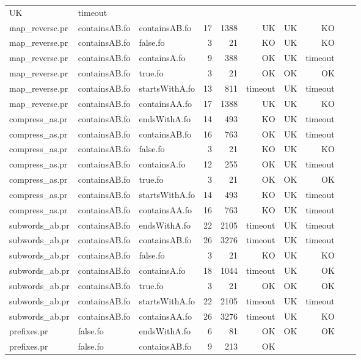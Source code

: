 \begin{tabular}{l|l|l|r|r|r|r|r|r|r}
UK & timeout \\
map\_reverse.pr & containsAB.fo & containsAB.fo & 17 & 1388 & UK & 
UK & KO \\
map\_reverse.pr & containsAB.fo & false.fo & 3 & 21 & KO & 
UK & KO \\
map\_reverse.pr & containsAB.fo & containsA.fo & 9 & 388 & OK & 
UK & timeout \\
map\_reverse.pr & containsAB.fo & true.fo & 3 & 21 & OK & 
OK & OK \\
map\_reverse.pr & containsAB.fo & startsWithA.fo & 13 & 811 & timeout & 
UK & timeout \\
map\_reverse.pr & containsAB.fo & containsAA.fo & 17 & 1388 & UK & 
UK & KO \\
compress\_as.pr & containsAB.fo & endsWithA.fo & 14 & 493 & KO & 
UK & timeout \\
compress\_as.pr & containsAB.fo & containsAB.fo & 16 & 763 & OK & 
UK & timeout \\
compress\_as.pr & containsAB.fo & false.fo & 3 & 21 & KO & 
UK & KO \\
compress\_as.pr & containsAB.fo & containsA.fo & 12 & 255 & OK & 
UK & timeout \\
compress\_as.pr & containsAB.fo & true.fo & 3 & 21 & OK & 
OK & OK \\
compress\_as.pr & containsAB.fo & startsWithA.fo & 14 & 493 & KO & 
UK & timeout \\
compress\_as.pr & containsAB.fo & containsAA.fo & 16 & 763 & KO & 
UK & timeout \\
subwords\_ab.pr & containsAB.fo & endsWithA.fo & 22 & 2105 & timeout & 
UK & timeout \\
subwords\_ab.pr & containsAB.fo & containsAB.fo & 26 & 3276 & timeout & 
UK & timeout \\
subwords\_ab.pr & containsAB.fo & false.fo & 3 & 21 & KO & 
UK & KO \\
subwords\_ab.pr & containsAB.fo & containsA.fo & 18 & 1044 & timeout & 
UK & OK \\
subwords\_ab.pr & containsAB.fo & true.fo & 3 & 21 & OK & 
OK & OK \\
subwords\_ab.pr & containsAB.fo & startsWithA.fo & 22 & 2105 & timeout & 
UK & timeout \\
subwords\_ab.pr & containsAB.fo & containsAA.fo & 26 & 3276 & timeout & 
UK & KO \\
prefixes.pr & false.fo & endsWithA.fo & 6 & 81 & OK & 
OK & OK \\
prefixes.pr & false.fo & containsAB.fo & 9 & 213 & OK & 

\end{tabular}
